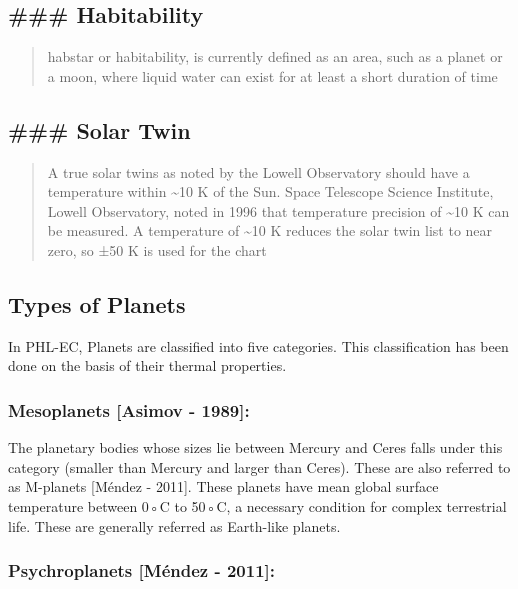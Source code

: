 \documentclass[11pt]{article}
\begin{document}
\subsection{\#\#\# Habitability}\label{habitability}

\begin{quote}
habstar or habitability, is currently defined as an area, such as a
planet or a moon, where liquid water can exist for at least a short
duration of time
\end{quote}

\subsection{\#\#\# Solar Twin}\label{solar-twin}

\begin{quote}
A true solar twins as noted by the Lowell Observatory should have a
temperature within \textasciitilde{}10 K of the Sun. Space Telescope
Science Institute, Lowell Observatory, noted in 1996 that temperature
precision of \textasciitilde{}10 K can be measured. A temperature of
\textasciitilde{}10 K reduces the solar twin list to near zero, so ±50 K
is used for the chart
\end{quote}

    \subsection{Types of Planets}\label{types-of-planets}

In PHL-EC, Planets are classified into five categories. This
classification has been done on the basis of their thermal properties.

\subsubsection{Mesoplanets {[}Asimov -
1989{]}:}\label{mesoplanets-asimov---1989}

The planetary bodies whose sizes lie between Mercury and Ceres falls
under this category (smaller than Mercury and larger than Ceres). These
are also referred to as M-planets {[}Méndez - 2011{]}. These planets
have mean global surface temperature between 0◦C to 50◦C, a necessary
condition for complex terrestrial life. These are generally referred as
Earth-like planets.

\subsubsection{Psychroplanets {[}Méndez -
2011{]}:}\label{psychroplanets-muxe9ndez---2011}
\end{document}
